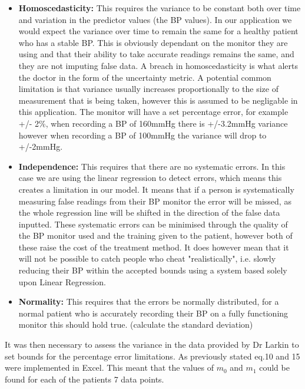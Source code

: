 \documentclass[11pt]{article}
\begin{document}
\begin{itemize}
\item 
\textbf{Homoscedasticity:} This requires the variance to be constant both over time and variation in the predictor values (the BP values). In our application we would expect the variance over time to remain the same for a healthy patient who has a stable BP. This is obviously dependant on the monitor they are using and that their ability to take accurate readings remains the same, and they are not imputing false data. A breach in homoscedasticity is what alerts the doctor in the form of the uncertainty metric. A potential common limitation is that variance usually increases proportionally to the size of measurement that is being taken, however this is assumed to be negligable in this application. The monitor will have a set percentage error, for example +/- 2\%, when recording a BP of 160mmHg there is +/-3.2mmHg variance however when recording a BP of 100mmHg the variance will drop to +/-2mmHg. 
\item 
\textbf{Independence:} This requires that there are no systematic errors. In this case we are using the linear regression to detect errors, which means this creates a limitation in our model. It means that if a person is systematically measuring false readings from their BP monitor the error will be missed, as the whole regression line will be shifted in the direction of the false data inputted. These systematic errors can be minimised through the quality of the BP monitor used and the training given to the patient, however both of these raise the cost of the treatment method. It does however mean that it will not be possible to catch people who cheat "realistically", i.e. slowly reducing their BP within the accepted bounds using a system based solely upon Linear Regression. 
\item 
\textbf{Normality:} This requires that the errors be normally distributed, for a normal patient who is accurately recording their BP on a fully functioning monitor this should hold true. (calculate the standard deviation) 
\end{itemize}

It was then necessary to assess the variance in the data provided by Dr Larkin to set bounds for the percentage error limitations. As previously stated eq.10 and 15 were implemented in Excel. This meant that the values of $m_0$ and $m_1$ could be found for each of the patients 7 data points. 
\end{document}

